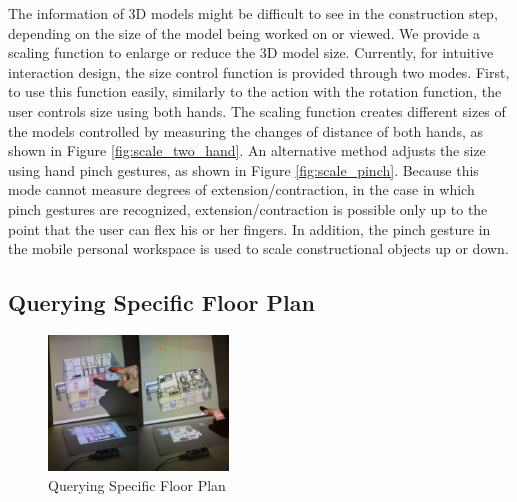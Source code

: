 The information of 3D models might be difficult to see in the construction step, depending on the size of the model being worked on or viewed. We provide a scaling function to enlarge or reduce the 3D model size. Currently, for intuitive interaction design, the size control function is provided through two modes. First, to use this function easily, similarly to the action with the rotation function, the user controls size using both hands. The scaling function creates different sizes of the models controlled by measuring the changes of distance of both hands, as shown in Figure \ref{fig:scale_two_hand}. An alternative method adjusts the size using hand pinch gestures, as shown in Figure \ref{fig:scale_pinch}. Because this mode cannot measure degrees of extension/contraction, in the case in which pinch gestures are recognized, extension/contraction is possible only up to the point that the user can flex his or her fingers. In addition, the pinch gesture in the mobile personal workspace is used to scale constructional objects up or down.
 

\subsection{Querying Specific Floor Plan}

\begin{figure}[b!]
\centering
\includegraphics[width=0.7\columnwidth, height=3.6cm]{4-Interaction_Design/query_plane}
\caption{Querying Specific Floor Plan}
\label{fig:layer}
\end{figure}


